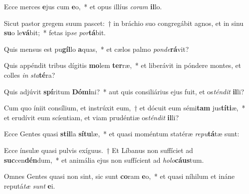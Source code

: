 \item Ecce merces \textbf{e}jus cum \textbf{e}o,~* et opus illíus \textit{co}\textit{ram} \textbf{il}lo.
\item Sicut pastor gregem suum pascet:~† in bráchio suo congregábit agnos, et in sinu \textbf{su}o le\textbf{vá}bit;~* fetas ip\textit{se} \textit{por}\textbf{tá}bit.
\item Quis mensus est pu\textbf{gíl}lo \textbf{a}quas,~* et cælos palmo \textit{pon}\textit{de}\textbf{rá}vit?
\item Quis appéndit tribus dígitis \textbf{mo}lem \textbf{ter}ræ,~* et liberávit in póndere montes, et colles \textit{in} \textit{sta}\textbf{té}ra?
\item Quis adjúvit \textbf{spí}ritum \textbf{Dó}\textbf{mi}ni?~* aut quis consiliárius ejus fuit, et os\textit{tén}\textit{dit} \textbf{il}li?
\item Cum quo íniit consílium, et instrúxit eum,~† et dócuit eum sémi\textbf{tam} jus\textbf{tí}\textbf{ti}æ,~* et erudívit eum scíentiam, et viam prudéntiæ os\textit{tén}\textit{dit} \textbf{il}li?
\item Ecce Gentes quasi \textbf{stil}la \textbf{sí}\textbf{tu}læ,~* et quasi moméntum statéræ \textit{re}\textit{pu}\textbf{tá}tæ sunt:
\item Ecce ínsulæ quasi pulvis exíguus.~† Et Líbanus non suffíciet ad \textbf{suc}cen\textbf{dén}dum,~* et animália ejus non suffícient ad \textit{ho}\textit{lo}\textbf{cáus}tum.
\item Omnes Gentes quasi non sint, sic sunt \textbf{co}ram \textbf{e}o,~* et quasi níhilum et ináne reputá\textit{tæ} \textit{sunt} \textbf{e}i.
